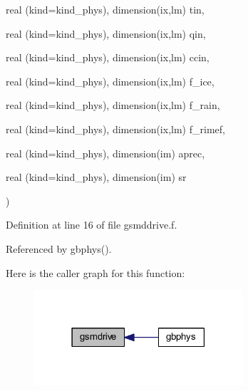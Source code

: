 {\begin{DoxyParamCaption}
\item[{real (kind=kind\+\_\+phys), dimension(ix,lm)}]{tin, }
\item[{real (kind=kind\+\_\+phys), dimension(ix,lm)}]{qin, }
\item[{real (kind=kind\+\_\+phys), dimension(ix,lm)}]{ccin, }
\item[{real (kind=kind\+\_\+phys), dimension(ix,lm)}]{f\+\_\+ice, }
\item[{real (kind=kind\+\_\+phys), dimension(ix,lm)}]{f\+\_\+rain, }
\item[{real (kind=kind\+\_\+phys), dimension(ix,lm)}]{f\+\_\+rimef, }
\item[{real (kind=kind\+\_\+phys), dimension(im)}]{aprec, }
\item[{real (kind=kind\+\_\+phys), dimension(im)}]{sr}
\end{DoxyParamCaption}
)}\hypertarget{gsmddrive_8f_afa4aee02bd0f01dde988f4b8621466a7}{}\label{gsmddrive_8f_afa4aee02bd0f01dde988f4b8621466a7}


Definition at line 16 of file gsmddrive.\+f.



Referenced by gbphys().



Here is the caller graph for this function\+:\nopagebreak
\begin{figure}[H]
\begin{center}
\leavevmode
\includegraphics[width=219pt]{gsmddrive_8f_afa4aee02bd0f01dde988f4b8621466a7_icgraph}
\end{center}
\end{figure}


